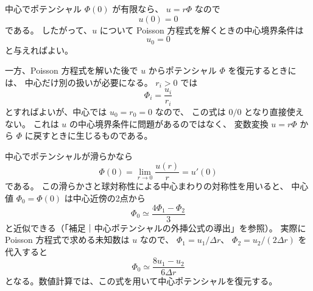 中心でポテンシャル $\Phi(0)$ が有限なら、
$u=r\Phi$ なので
\begin{equation}
 u(0)=0
\label{eq:ch2-u0}
\end{equation}
である。
したがって、$u$ について Poisson 方程式を解くときの中心境界条件は
\begin{equation}
 u_0=0
\end{equation}
と与えればよい。

一方、Poisson 方程式を解いた後で $u$ からポテンシャル $\Phi$ を復元するときには、
中心だけ別の扱いが必要になる。
$r_i>0$ では
\begin{equation}
 \Phi_i=\frac{u_i}{r_i}
\end{equation}
とすればよいが、中心では $u_0=r_0=0$ なので、
この式は $0/0$ となり直接使えない。
これは $u$ の中心境界条件に問題があるのではなく、
変数変換 $u=r\Phi$ から $\Phi$ に戻すときに生じるものである。

中心でポテンシャルが滑らかなら
\begin{equation}
 \Phi(0)
 =\lim_{r\to0}\frac{u(r)}{r}
 =u'(0)
\label{eq:ch2-center-limit}
\end{equation}
である。
この滑らかさと球対称性による中心まわりの対称性を用いると、
中心値 $\Phi_0=\Phi(0)$ は中心近傍の2点から
\begin{equation}
 \boxed{
 \Phi_0
 \simeq
 \frac{4\Phi_1-\Phi_2}{3}
 }
\label{eq:ch2-center-phi}
\end{equation}
と近似できる（「補足｜中心ポテンシャルの外挿公式の導出」を参照）。
実際に Poisson 方程式で求める未知数は $u$ なので、
$\Phi_1=u_1/\Delta r$、
$\Phi_2=u_2/(2\Delta r)$ を代入すると
\begin{equation}
 \boxed{
 \Phi_0
 \simeq
 \frac{8u_1-u_2}{6\Delta r}
 }
\label{eq:ch2-center-u}
\end{equation}
となる。数値計算では、この式を用いて中心ポテンシャルを復元する。

